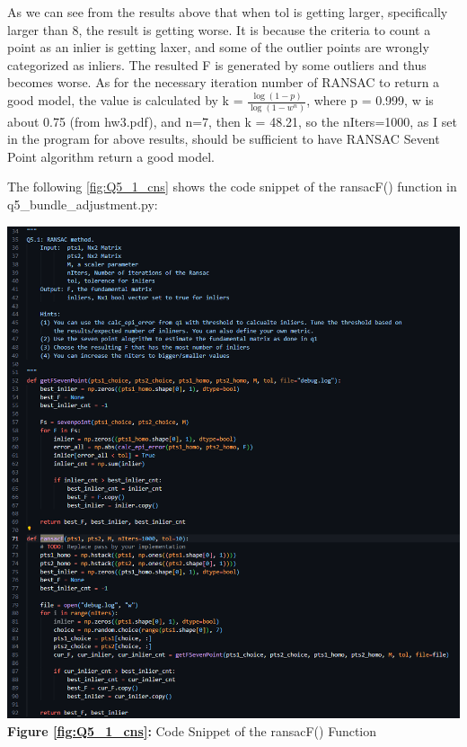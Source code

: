 \begin{your_solution}[title=Q5.1 continued, height=22.7cm,width=\linewidth]
As we can see from the results above that when tol is getting larger, specifically larger than 8, the result is getting worse. It is because the criteria to count a point as an inlier is getting laxer, and some of the outlier points are wrongly categorized as inliers. The resulted F is generated by some outliers and thus becomes worse. As for the necessary iteration number of RANSAC to return a good model, the value is calculated by k = $\frac{\log(1-p)}{\log(1-w^n)}$, where p = 0.999, w is about 0.75 (from hw3.pdf), and n=7, then k = 48.21, so the nIters=1000, as I set in the program for above results, should be sufficient to have RANSAC Sevent Point algorithm return a good model.
\newline

The following \autoref{fig:Q5_1_cns} shows the code snippet of the ransacF() function in q5\_bundle\_adjustment.py:	
\newline


\begin{minipage}{1\linewidth}
	\centering
	\includegraphics[width=1\linewidth, height=1\columnwidth]{../Q5_1_cns.png}
	\textbf{Figure \ref{fig:Q5_1_cns}:} Code Snippet of the ransacF() Function  %
	\label{fig:Q5_1_cns}         %
\end{minipage}
\end{your_solution}

